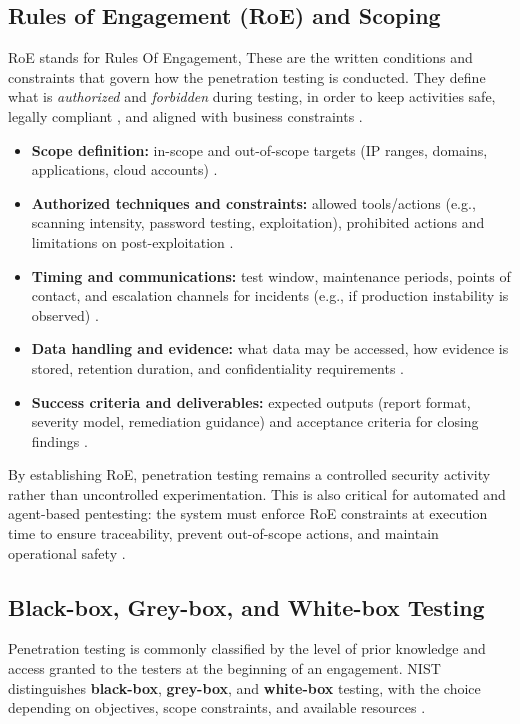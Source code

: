 \subsection{Rules of Engagement (RoE) and Scoping}
\label{subsubsec:ch1-roe}
RoE stands for Rules Of Engagement, These are the written conditions and constraints that govern how the penetration testing is conducted.
They define what is \textit{authorized} and \textit{forbidden} during testing, in order to keep activities safe, legally compliant
, and aligned with business constraints \cite{nistSP800115}.
\begin{itemize}
  \item \textbf{Scope definition:} in-scope and out-of-scope targets (IP ranges, domains, applications, cloud accounts) \cite{nistSP800115}.
  \item \textbf{Authorized techniques and constraints:} allowed tools/actions (e.g., scanning intensity, password testing, exploitation),
  prohibited actions and limitations on post-exploitation \cite{nistSP800115}.
  \item \textbf{Timing and communications:} test window, maintenance periods, points of contact, and escalation channels for incidents
  (e.g., if production instability is observed) \cite{nistSP800115}.
  \item \textbf{Data handling and evidence:} what data may be accessed, how evidence is stored, retention duration, and confidentiality
  requirements \cite{nistSP800115}.
  \item \textbf{Success criteria and deliverables:} expected outputs (report format, severity model, remediation guidance) and acceptance
  criteria for closing findings \cite{nistSP800115}.
\end{itemize}

By establishing RoE, penetration testing remains a controlled security activity rather than uncontrolled experimentation.
This is also critical for automated and agent-based pentesting: the system must enforce RoE constraints at execution time to ensure
traceability, prevent out-of-scope actions, and maintain operational safety \cite{nistSP800115,checkmate}.

\subsection{Black-box, Grey-box, and White-box Testing}
\label{subsubsec:ch1-box}
Penetration testing is commonly classified by the level of prior knowledge and access granted to the testers at the beginning of an engagement. NIST distinguishes \textbf{black-box}, \textbf{grey-box}, and \textbf{white-box} testing, with the choice depending on objectives, scope constraints, and available resources \cite{nistSP80053,nistSP800115}.

